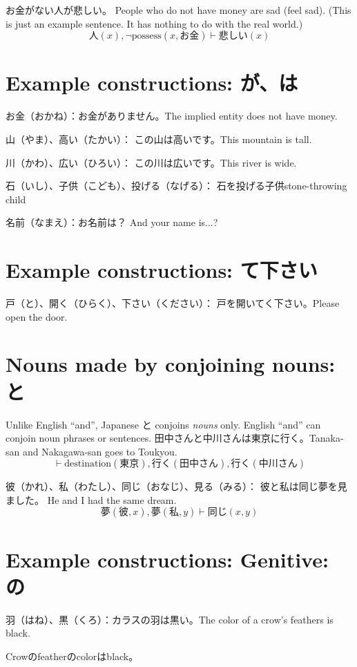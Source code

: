 お金がない人が悲しい。
People who do not have money are sad (feel sad).
(This is just an example sentence.
It has nothing to do with the real world.)
\[
    人(x), \neg \text{possess}(x,お金) \vdash 悲しい(x)
\]

\section{Example constructions: が、は}

お金（おかね）：お金がありません。The implied entity does not have money.

山（やま）、高い（たかい）：
この山は高いです。This mountain is tall.

川（かわ）、広い（ひろい）：
この川は広いです。This river is wide.

石（いし）、子供（こども）、投げる（なげる）：
石を投げる子供stone-throwing child

名前（なまえ）：お名前は？
And your name is...?

\section{Example constructions: て下さい}

戸（と）、開く（ひらく）、下さい（ください）：
戸を開いてく下さい。Please open the door.

\section{Nouns made by conjoining nouns: と}

Unlike English ``and'', Japanese と conjoins \emph{nouns} only.
English ``and'' can conjoin noun phrases or sentences.
田中さんと中川さんは東京に行く。Tanaka-san and Nakagawa-san goes to Toukyou.
\[
    \vdash \text{destination}(東京),行く(田中さん),行く(中川さん)
\]

彼（かれ）、私（わたし）、同じ（おなじ）、見る（みる）：
彼と私は同じ夢を見ました。
He and I had the same dream.
\[
    夢(彼,x), 夢(私,y) \vdash 同じ(x,y)
\]

\section{Example constructions: Genitive: の}

羽（はね）、黒（くろ）：カラスの羽は黒い。The color of a crow's feathers is black.

Crowのfeatherのcolorはblack。

